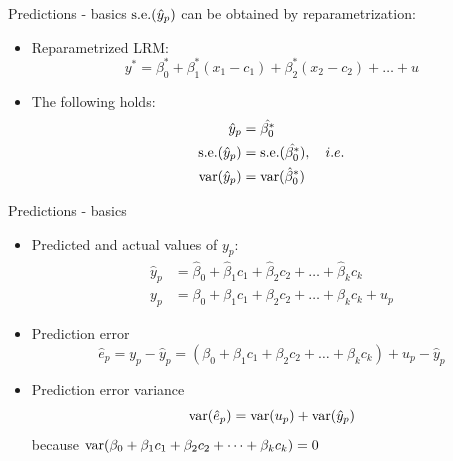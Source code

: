 \documentclass{beamer}
\begin{document}

\begin{frame}{Predictions - basics}
$\textnormal{s.e.}(\hat{y}_p)$ can be obtained by reparametrization:

\vspace{0.5cm}
\begin{itemize}
\item Reparametrized LRM:
$$y^*=\beta^*_0 + \beta^*_1 (x_1 -c_1) + \beta^*_2(x_2 - c_2) + \dots + u$$
\item The following holds:
\begin{align} \nonumber
 \hat{y}_p &= \hat{\beta_0^*} \\ \nonumber
 \textnormal{s.e.}(\hat{y}_p ) &= 
   \textnormal{s.e.}(\hat{\beta_0^*}), \quad i.e. \\ \nonumber
 \textnormal{var}(\hat{y}_p) &= \textnormal{var}(\hat{\beta}_0^*)
\end{align} 
\end{itemize}
\end{frame}


\begin{frame}{Predictions - basics}
\begin{itemize}
\item Predicted and actual values of $y_p$:
\begin{align}\nonumber
\hat{y}_p &  = \hat{\beta}_0 + \hat{\beta}_1 c_1 + \hat{\beta}_2 c_2 + \dots + \hat{\beta}_k c_k\\ \nonumber
y_p & = \beta_0 + \beta_1 c_1 + \beta_2 c_2 + \dots+\beta_k c_k + u_p \nonumber
\end{align} 
\item Prediction error
$$\hat{e}_p = y_p - \hat{y}_p = (\beta_0 + \beta_1 c_1 + \beta_2 c_2 + \dots+\beta_k c_k) + u_p - \hat{y}_p$$
\item Prediction error variance
$$\textnormal{var}(\hat{e}_p) = \textnormal{var}(u_p) + \textnormal{var}(\hat{y}_p)$$
because $\textnormal{var}(\beta_0 + \beta_1 c_1 + \beta_2 c_2 + \dots+\beta_k c_k)=0$
\end{itemize}
\end{frame}

\end{document}
